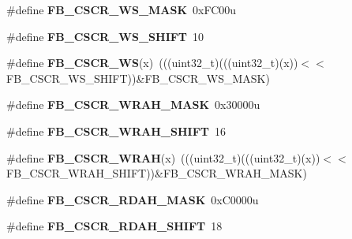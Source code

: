 \begin{DoxyCompactItemize}
\item 
\#define {\bfseries F\+B\+\_\+\+C\+S\+C\+R\+\_\+\+W\+S\+\_\+\+M\+A\+SK}~0x\+F\+C00u\hypertarget{group__FB__Register__Masks_gaf6ddd3e9e267951e4af3886b8bf0c54e}{}\label{group__FB__Register__Masks_gaf6ddd3e9e267951e4af3886b8bf0c54e}

\item 
\#define {\bfseries F\+B\+\_\+\+C\+S\+C\+R\+\_\+\+W\+S\+\_\+\+S\+H\+I\+FT}~10\hypertarget{group__FB__Register__Masks_ga32c1c45a903fe04d1a3ffc5c2f95254f}{}\label{group__FB__Register__Masks_ga32c1c45a903fe04d1a3ffc5c2f95254f}

\item 
\#define {\bfseries F\+B\+\_\+\+C\+S\+C\+R\+\_\+\+WS}(x)~(((uint32\+\_\+t)(((uint32\+\_\+t)(x))$<$$<$F\+B\+\_\+\+C\+S\+C\+R\+\_\+\+W\+S\+\_\+\+S\+H\+I\+FT))\&F\+B\+\_\+\+C\+S\+C\+R\+\_\+\+W\+S\+\_\+\+M\+A\+SK)\hypertarget{group__FB__Register__Masks_ga1841831455a8eb60266de1720338fca6}{}\label{group__FB__Register__Masks_ga1841831455a8eb60266de1720338fca6}

\item 
\#define {\bfseries F\+B\+\_\+\+C\+S\+C\+R\+\_\+\+W\+R\+A\+H\+\_\+\+M\+A\+SK}~0x30000u\hypertarget{group__FB__Register__Masks_ga2843fc1784996e04d8a936a38da538af}{}\label{group__FB__Register__Masks_ga2843fc1784996e04d8a936a38da538af}

\item 
\#define {\bfseries F\+B\+\_\+\+C\+S\+C\+R\+\_\+\+W\+R\+A\+H\+\_\+\+S\+H\+I\+FT}~16\hypertarget{group__FB__Register__Masks_gac68c032af50701cb3bbc1f1448b5ba2c}{}\label{group__FB__Register__Masks_gac68c032af50701cb3bbc1f1448b5ba2c}

\item 
\#define {\bfseries F\+B\+\_\+\+C\+S\+C\+R\+\_\+\+W\+R\+AH}(x)~(((uint32\+\_\+t)(((uint32\+\_\+t)(x))$<$$<$F\+B\+\_\+\+C\+S\+C\+R\+\_\+\+W\+R\+A\+H\+\_\+\+S\+H\+I\+FT))\&F\+B\+\_\+\+C\+S\+C\+R\+\_\+\+W\+R\+A\+H\+\_\+\+M\+A\+SK)\hypertarget{group__FB__Register__Masks_gaa98e7dddfbb686316efe80b91c74f4ef}{}\label{group__FB__Register__Masks_gaa98e7dddfbb686316efe80b91c74f4ef}

\item 
\#define {\bfseries F\+B\+\_\+\+C\+S\+C\+R\+\_\+\+R\+D\+A\+H\+\_\+\+M\+A\+SK}~0x\+C0000u\hypertarget{group__FB__Register__Masks_ga31adeea4793143604b28e1ca000b19df}{}\label{group__FB__Register__Masks_ga31adeea4793143604b28e1ca000b19df}

\item 
\#define {\bfseries F\+B\+\_\+\+C\+S\+C\+R\+\_\+\+R\+D\+A\+H\+\_\+\+S\+H\+I\+FT}~18\hypertarget{group__FB__Register__Masks_gaade1cbb82ddd98295330c376eabcca7e}{}\label{group__FB__Register__Masks_gaade1cbb82ddd98295330c376eabcca7e}


\end{DoxyCompactItemize}

